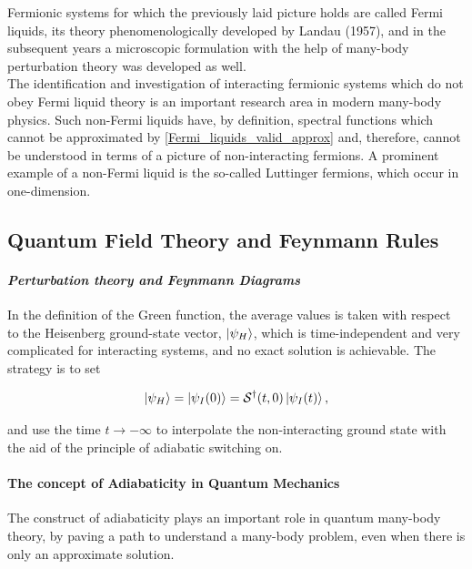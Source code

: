 \documentclass{homework}
\begin{document}
\begin{tcolorbox}[colback=yellow, 
title = Physical Context]

Fermionic systems for which the previously laid picture holds are called Fermi liquids, its theory phenomenologically developed by Landau (1957), and in the subsequent years a microscopic formulation with the help of many-body perturbation theory was developed as well. \\

The identification and investigation of interacting fermionic systems which do not obey Fermi liquid theory is an important research area in modern many-body physics. Such non-Fermi liquids have, by definition, spectral functions which cannot be approximated by \cref{Fermi_liquids_valid_approx} and, therefore, cannot be understood in terms of a picture of non-interacting fermions. A prominent example of a non-Fermi liquid is the so-called Luttinger fermions, which occur in one-dimension.  
\end{tcolorbox}

\subsection{\textbf{Quantum Field Theory and Feynmann Rules}}

\paragraph{\textit{Perturbation theory and Feynmann Diagrams}}

In the definition of the Green function, the average values is taken with respect to the Heisenberg ground-state vector, $\ket{\psi_H}$, which is time-independent and very complicated for interacting systems, and no exact solution is achievable. The strategy is to set 

$$
    \ket{\psi_H} = \ket{\psi_I (0)} = \mathcal{S}^\dagger(t,0) \ket{\psi_I (t)},
$$

and use the time $t \rightarrow -\infty$ to interpolate the non-interacting ground state with the aid of the principle of adiabatic switching on. \\

\paragraph{The concept of Adiabaticity in Quantum Mechanics} 

The construct of adiabaticity plays an important role in quantum many-body theory, by paving a path to understand a many-body problem, even when there is only an approximate solution. \\
\end{document}
